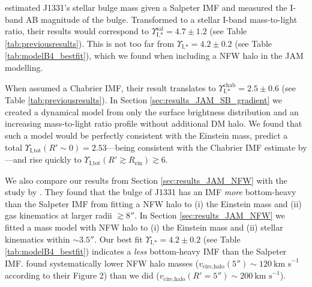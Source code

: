 \documentclass[useAMS,usenatbib]{mnras}
\begin{document}
\citet{SWELLSI} estimated J1331's stellar bulge mass given a Salpeter IMF and measured the I-band AB magnitude of the bulge. Transformed to a stellar I-band mass-to-light ratio, their results would correspond to $\Upsilon_\text{I,*}^\text{sal} = 4.7 \pm 1.2$ (see Table \ref{tab:previousresults}). This is not too far from $\Upsilon_\text{I,*} = 4.2 \pm 0.2$ (see Table \ref{tab:modelB4_bestfit}), which we found when including a NFW halo in the JAM modelling.

When \citet{SWELLSI} assumed a Chabrier IMF, their result translates to $\Upsilon_\text{I,*}^\text{chab} = 2.5 \pm 0.6$ (see Table \ref{tab:previousresults}). In Section \ref{sec:results_JAM_SB_gradient} we created a dynamical model from only the surface brightness distribution and an increasing mass-to-light ratio profile without additional DM halo. We found that such a model would be perfectly consistent with the Einstein mass, predict a total $\Upsilon_\text{I,tot}(R'\sim0) = 2.53$---being consistent with the Chabrier IMF estimate by \citet{SWELLSI}---and rise quickly to $\Upsilon_\text{I,tot}(R'\gtrsim R_\text{ein}) \gtrsim 6$.

We also compare our results from Section \ref{sec:results_JAM_NFW} with the study by \citet{SWELLSV}. They found that the bulge of J1331 has an IMF \emph{more} bottom-heavy than the Salpeter IMF from fitting a NFW halo to (i) the Einstein mass and (ii) gas kinematics at larger radii $\gtrsim 8''$. In Section \ref{sec:results_JAM_NFW} we fitted a mass model with NFW halo to (i) the Einstein mass and (ii) stellar kinematics within $\sim 3.5''$. Our best fit $\Upsilon_\text{I,*} = 4.2 \pm 0.2$ (see Table \ref{tab:modelB4_bestfit}) indicates a \emph{less} bottom-heavy IMF than the Salpeter IMF. \cite{SWELLSV} found systematically lower NFW halo masses ($v_\text{circ,halo}(5'') \sim 120~\text{km s}^{-1}$ according to their Figure 2) than we did ($v_\text{circ,halo}(R'=5'') \sim 200~\text{km s}^{-1}$).
\end{document}
